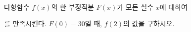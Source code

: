 다항함수 $f(x)$의 한 부정적분 $F(x)$가 모든 실수 $x$에 대하여 \par\smallskip{}\par\smallskip\noindent 를 만족시킨다. $F(0)=30$일 때, $f(2)$의 값을 구하시오.
